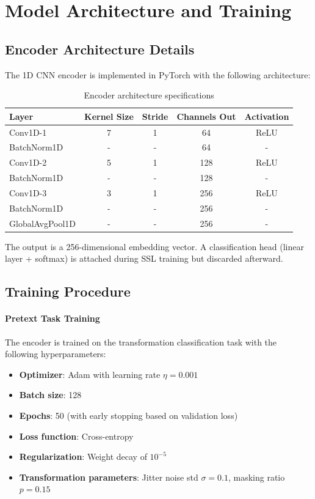 \section{Model Architecture and Training}

\subsection{Encoder Architecture Details}

The 1D CNN encoder is implemented in PyTorch with the following architecture:

\begin{table}[htbp]
\centering
\caption{Encoder architecture specifications}
\label{tab:encoder_arch}
\begin{tabular}{@{}lcccc@{}}
\toprule
Layer & Kernel Size & Stride & Channels Out & Activation \\
\midrule
Conv1D-1 & 7 & 1 & 64 & ReLU \\
BatchNorm1D & - & - & 64 & - \\
Conv1D-2 & 5 & 1 & 128 & ReLU \\
BatchNorm1D & - & - & 128 & - \\
Conv1D-3 & 3 & 1 & 256 & ReLU \\
BatchNorm1D & - & - & 256 & - \\
GlobalAvgPool1D & - & - & 256 & - \\
\bottomrule
\end{tabular}
\end{table}

The output is a 256-dimensional embedding vector. A classification head (linear layer + softmax) is attached during SSL training but discarded afterward.

\subsection{Training Procedure}

\paragraph{Pretext Task Training}

The encoder is trained on the transformation classification task with the following hyperparameters:

\begin{itemize}
    \item \textbf{Optimizer}: Adam with learning rate $\eta = 0.001$
    \item \textbf{Batch size}: 128
    \item \textbf{Epochs}: 50 (with early stopping based on validation loss)
    \item \textbf{Loss function}: Cross-entropy
    \item \textbf{Regularization}: Weight decay of $10^{-5}$
    \item \textbf{Transformation parameters}: Jitter noise std $\sigma = 0.1$, masking ratio $p = 0.15$
\end{itemize}

